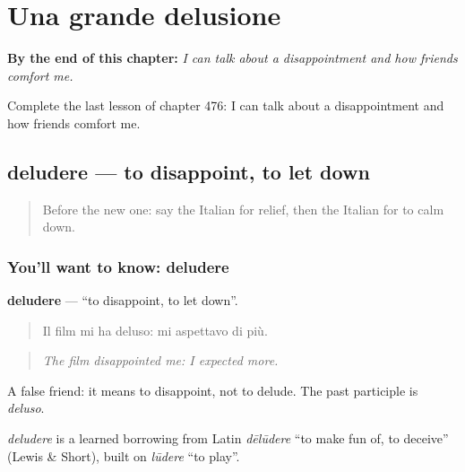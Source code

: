 
\chapter{Una grande delusione}
\label{ch:it-una-grande-delusione}

\begin{chapteropening}
\textbf{By the end of this chapter:} \emph{I can talk about a disappointment and how friends comfort me.}

Complete the last lesson of chapter 476: I can talk about a disappointment and how friends comfort me.
\end{chapteropening}

\section[deludere]{deludere — to disappoint, to let down}

\label{lesson:IT-C476-deludere}



\begin{quote}
Before the new one: say the Italian for relief, then the Italian for to calm down.
\end{quote}

\subsection*{You'll want to know: deludere}
\textbf{deludere} — \textquotedblleft{}to disappoint, to let down\textquotedblright{}.

\begin{quote}
Il film mi ha deluso: mi aspettavo di più.
\end{quote}

\begin{quote}
\emph{The film disappointed me: I expected more.}
\end{quote}

A false friend: it means to disappoint, not to delude. The past participle is \emph{deluso}.

\begin{cousinweb}
\emph{deludere} is a learned borrowing from Latin \emph{dēlūdere} \textquotedblleft{}to make fun of, to deceive\textquotedblright{} (Lewis \& Short), built on \emph{lūdere} \textquotedblleft{}to play\textquotedblright{}.
\end{cousinweb}

